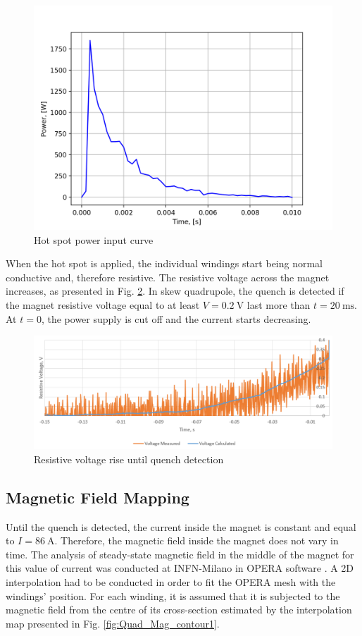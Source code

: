 \begin{figure}[ht!]
    \centering
    \includegraphics[width=0.45\linewidth]{figures/skew_quad_bcs/Polynomial_Power_Fit.png}
    \caption{Hot spot power input curve}
    \label{fig:hot_spot_power_input_curve}
\end{figure}

When the hot spot is applied, the individual windings start being normal conductive and, therefore resistive. The resistive voltage across the magnet increases, as presented in Fig. \ref{fig:res_volt_curve_quench_detection}. In skew quadrupole, the quench is detected if the magnet resistive voltage equal to at least $V=0.2~\text{V}$ last more than $t=20~\text{ms}$. At $t=0$, the power supply is cut off and the current starts decreasing.

\begin{figure}[ht!]
    \centering
    \includegraphics[width=0.6\linewidth]{figures/skew_quad_bcs/quench_det_v_curve.png}
    \caption{Resistive voltage rise until quench detection}
    \label{fig:res_volt_curve_quench_detection}
\end{figure}

\subsection{Magnetic Field Mapping}
Until the quench is detected, the current inside the magnet is constant and equal to $I=86~\text{A}$. Therefore, the magnetic field inside the magnet does not vary in time. The analysis of steady-state magnetic field in the middle of the magnet for this value of current was conducted at INFN-Milano in OPERA software \cite{samuele_mariotto_mails}. A 2D interpolation had to be conducted in order to fit the OPERA mesh with the windings' position. For each winding, it is assumed that it is subjected to the magnetic field from the centre of its cross-section estimated by the interpolation map presented in Fig. \ref{fig:Quad_Mag_contour1}.

